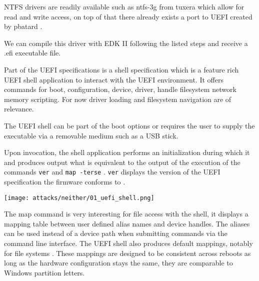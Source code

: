 NTFS drivers are readily available such as ntfs-3g from tuxera \cite{ntfs-3g} which allow for read and write access, on top of that there already exists a port to UEFI created by pbatard \cite{ntfs-3g-uefi}.

We can compile this driver with EDK II following the listed steps and receive a .efi executable file.

Part of the UEFI specifications is a shell specification which is a feature rich UEFI shell application to interact with the UEFI environment.
It offers commands for
boot,
configuration,
device, driver, handle
filesystem
network
memory
scripting.
For now driver loading and filesystem navigation are of relevance.

The UEFI shell can be part of the boot options or requires the user to supply the executable via a removable medium such as a USB stick.

Upon invocation, the shell application performs an initialization during which it  and produces output what is equivalent to the output of the execution of the commands \lstinline{ver} and \lstinline{map -terse} \cite[3.3 Initialization]{uefi-shell}. \lstinline{ver} displays the version of the UEFI specification the firmware conforms to \cite[5.3 Shell Commands]{uefi-shell}.

\texttt{[image: attacks/neither/01\_uefi\_shell.png]}


The map command is very interesting for file access with the shell, it displays a mapping table between user defined alias names and device handles. The aliases can be used instead of a device path when submitting commands via the command line interface. The UEFI shell also produces default mappings, notably for file systems \cite[3.7.2. Mappings]{uefi-shell}. These mappings are designed to be consistent across reboots as long as the hardware configuration stays the same, they are comparable to Windows partition letters. \cite[Appendix A]{uefi-shell}

